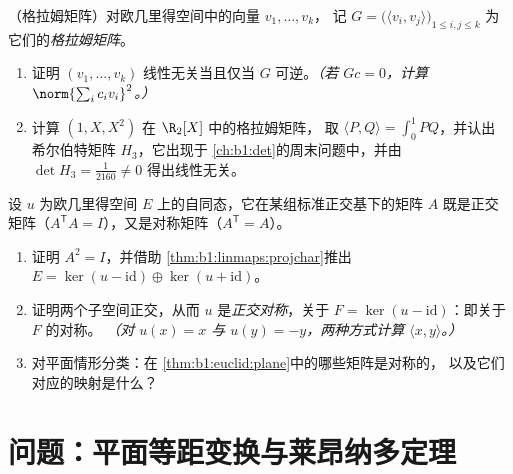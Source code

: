 \begin{exercise}[$\star\star$]\label{exo:b1:euclid:11}
（格拉姆矩阵）对欧几里得空间中的向量 $v_1, \dots, v_k$，
记 $G = \bigl(\langle v_i, v_j\rangle\bigr)_{1 \leq i, j
\leq k}$ 为它们的\emph{格拉姆矩阵}。
\begin{enumerate}
  \item 证明 $(v_1, \dots, v_k)$ 线性无关当且仅当
        $G$ 可逆。\emph{（若 $Gc = 0$，计算
        $\norm{\sum_i c_i v_i}^2$。）}
  \item 计算 $(1, X, X^2)$ 在 $\R_2[X]$ 中的格拉姆矩阵，
        取 $\langle P, Q\rangle = \int_0^1 PQ$，并认出
        希尔伯特矩阵 $H_3$，它出现于
        \cref{ch:b1:det}的周末问题中，并由 $\det H_3 =
        \frac1{2160} \neq 0$ 得出线性无关。
\end{enumerate}
\end{exercise}

\begin{exercise}[$\star\star\star$]\label{exo:b1:euclid:12}
设 $u$ 为欧几里得空间 $E$ 上的自同态，它在某组标准正交基下的矩阵
$A$ 既是正交矩阵（$A^{\mathsf T}A
= I$），又是对称矩阵（$A^{\mathsf T} = A$）。
\begin{enumerate}
  \item 证明 $A^2 = I$，并借助
        \cref{thm:b1:linmaps:projchar}推出 $E = \ker(u -
        \mathrm{id}) \oplus \ker(u + \mathrm{id})$。
  \item 证明两个子空间正交，从而 $u$
        是\emph{正交对称}，关于 $F =
        \ker(u - \mathrm{id})$：即关于 $F$ 的对称。
        \emph{（对 $u(x) = x$ 与 $u(y) = -y$，两种方式计算 $\langle
        x, y\rangle$。）}
  \item 对平面情形分类：在
        \cref{thm:b1:euclid:plane}中的哪些矩阵是对称的，
        以及它们对应的映射是什么？
\end{enumerate}
\end{exercise}

\section{问题：平面等距变换与莱昂纳多定理}

